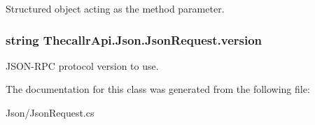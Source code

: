 Structured object acting as the method parameter. 

\hypertarget{class_thecallr_api_1_1_json_1_1_json_request_a167b1e5a74a478c3358eb642ce791c66}{
\subsubsection[{version}]{\setlength{\rightskip}{0pt plus 5cm}string Thecallr\+Api.\+Json.\+Json\+Request.\+version\hspace{0.3cm}{\ttfamily [get]}}}\label{class_thecallr_api_1_1_json_1_1_json_request_a167b1e5a74a478c3358eb642ce791c66}


J\+S\+O\+N-\/\+R\+P\+C protocol version to use. 



The documentation for this class was generated from the following file\+:\begin{DoxyCompactItemize}
\item 
Json/Json\+Request.\+cs\end{DoxyCompactItemize}
